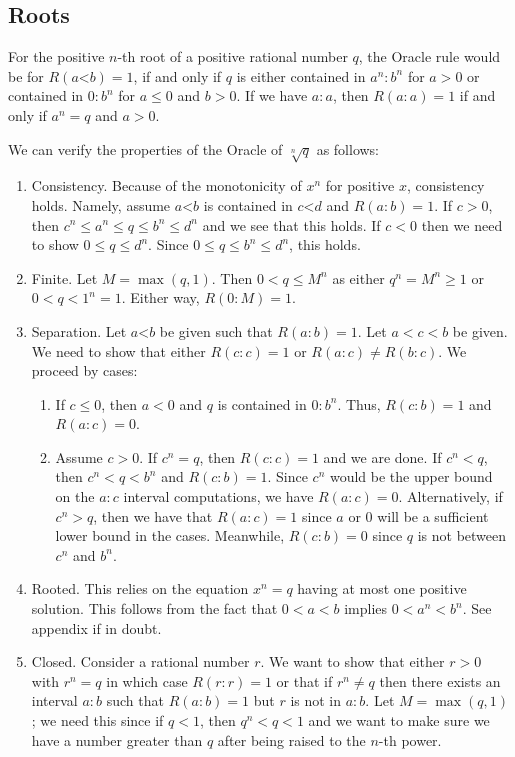 \documentclass[12pt]{article}
\theoremstyle{remark}
\newcommand{\lt}{\mathord{<}}
\begin{document}
\subsection{Roots}

For the positive $n$-th root of a positive rational number $q$, the Oracle rule would be for $R(a\lt b) = 1$, if and only if $q$ is either contained in $a^n:b^n$ for $a>0$ or contained in $0:b^n$ for $a \leq 0$ and $b>0$. If we have $a:a$, then $R(a:a) = 1$ if and only if $a^n = q$ and $a>0$.

We can verify the properties of the Oracle of $\sqrt[n]{q}$ as follows: 

\begin{enumerate}
    \item Consistency. Because of the monotonicity of $x^n$ for positive $x$, consistency holds. Namely, assume $a\lt b$ is contained in $c \lt d$ and $R(a:b)=1$. If $c>0$, then $c^n \leq a^n \leq q \leq b^n \leq d^n$ and we see that this holds. If $c<0$ then we need to show $0 \leq q \leq d^n$. Since $0 \leq q \leq  b^n \leq d^n$, this holds. 
    \item Finite. Let $M = \max(q, 1)$. Then $0 < q \leq M^n$ as either $q^n = M^n \geq 1$ or $0 < q < 1^n = 1$. Either way, $R(0:M) = 1$. 
    \item Separation. Let $a\lt b$ be given such that $R(a:b)=1$. Let $a < c <b$ be given. We need to show that either $R(c:c) = 1$ or $R(a:c) \neq R(b:c)$. We proceed by cases:
    \begin{enumerate}
        \item If $c \leq 0$, then $a<0$ and $q$ is contained in $0:b^n$. Thus, $R(c:b) = 1$ and $R(a:c) = 0$. 
        \item Assume $c>0$. If $c^n = q$, then $R(c:c)=1$ and we are done. If $c^n < q$, then $c^n < q< b^n$ and $R(c:b)=1$. Since $c^n$ would be the upper bound on the $a:c$ interval computations, we have $R(a:c)=0$. Alternatively, if $c^n > q$, then we have that $R(a:c)=1$ since $a$ or $0$ will be a sufficient lower bound in the cases. Meanwhile, $R(c:b) = 0$ since $q$ is not between $c^n$ and $b^n$. 
    \end{enumerate}
     \item Rooted. This relies on the equation $x^n = q$ having at most one positive solution. This follows from the fact that $0<a<b$ implies $0 < a^n < b^n$. See appendix if in doubt. 
    \item Closed. Consider a rational number $r$. We want to show that either $r>0$ with $r^n = q$ in which case $R(r:r)=1$ or that if $r^n \neq q$ then there exists an interval $a:b$ such that $R(a:b)=1$ but $r$ is not in $a:b$. Let $M = \max(q, 1)$; we need this since if $q<1$, then $q^n < q < 1$ and we want to make sure we have a number greater than $q$ after being raised to the $n$-th power. 
    

\end{enumerate}
\end{document}

